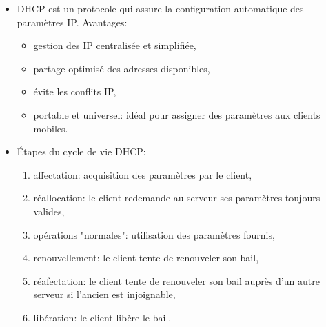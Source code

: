 \documentclass[a4paper]{article}
\begin{document}
\begin{itemize}
\item DHCP est un protocole qui assure la configuration automatique des paramètres IP. Avantages:
\begin{itemize}
    \item gestion des IP centralisée et simplifiée,
    \item partage optimisé des adresses disponibles,
    \item évite les conflits IP,
    \item portable et universel: idéal pour assigner des paramètres aux clients mobiles.
\end{itemize}





\item Étapes du cycle de vie DHCP:
\begin{enumerate}
    \item affectation: acquisition des paramètres par le client,
    \item réallocation: le client redemande au serveur ses paramètres toujours valides,
    \item opérations "normales": utilisation des paramètres fournis,
    \item renouvellement: le client tente de renouveler son bail,
    \item réafectation: le client tente de renouveler son bail auprès d'un autre serveur si l'ancien est injoignable,
    \item libération: le client libère le bail.
\end{enumerate}






\end{itemize}
\end{document}
